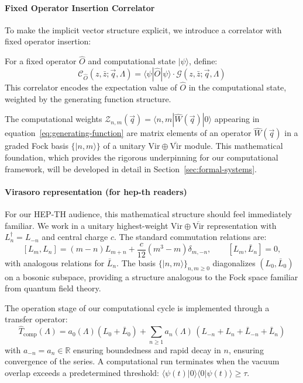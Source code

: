 \paragraph{Fixed Operator Insertion Correlator}
To make the implicit vector structure explicit, we introduce a correlator with fixed operator insertion:
\begin{definition}
\label{def:fixed-operator-correlator}
For a fixed operator $\hat{O}$ and computational state $|\psi\rangle$, define:
\[
\mathcal{C}_{\hat{O}}(z,\bar{z};\vec{q},\Lambda) = \langle\psi|\hat{O}|\psi\rangle \cdot \mathcal{G}(z,\bar{z};\vec{q},\Lambda)
\]
This correlator encodes the expectation value of $\hat{O}$ in the computational state, weighted by the generating function structure.
\end{definition}

The computational weights $\mathcal{Z}_{n,m}(\vec{q})=\langle n,m|\hat{W}(\vec{q})|0\rangle$ appearing in equation~\eqref{eq:generating-function} are matrix elements of an operator $\hat{W}(\vec{q})$ in a graded Fock basis $\{|n,m\rangle\}$ of a unitary $\text{Vir}\oplus\overline{\text{Vir}}$ module. This mathematical foundation, which provides the rigorous underpinning for our computational framework, will be developed in detail in Section~\ref{sec:formal-systems}.

\paragraph{Virasoro representation (for hep-th readers)}
For our HEP-TH audience, this mathematical structure should feel immediately familiar. We work in a unitary highest-weight $\mathrm{Vir}\oplus\overline{\mathrm{Vir}}$ representation with $L_n^\dagger=L_{-n}$ and central charge $c$. The standard commutation relations are:
\[
[L_m,L_n]=(m-n)L_{m+n}+\frac{c}{12}(m^3-m)\delta_{m,-n},\qquad [L_m,\bar{L}_n]=0,
\]
with analogous relations for $\bar{L}_n$. The basis $\{|n,m\rangle\}_{n,m\ge0}$ diagonalizes $(L_0,\bar{L}_0)$ on a bosonic subspace, providing a structure analogous to the Fock space familiar from quantum field theory.

The operation stage of our computational cycle is implemented through a transfer operator:
\[
\hat{T}_{\text{comp}}(\Lambda)=a_0(\Lambda)(L_0+\bar{L}_0)+\sum_{n\ge1}a_n(\Lambda)\,(L_{-n}+L_n+\bar{L}_{-n}+\bar{L}_n)
\]
with $a_{-n}=a_n\in\mathbb{R}$ ensuring boundedness and rapid decay in $n$, ensuring convergence of the series. A computational run terminates when the vacuum overlap exceeds a predetermined threshold: $\langle\psi(t)|0\rangle\langle 0|\psi(t)\rangle\ge\tau$.

